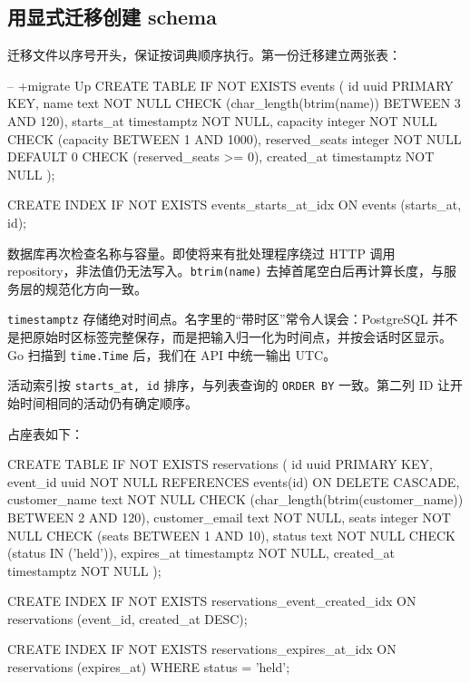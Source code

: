 \subsection{用显式迁移创建 schema}

迁移文件以序号开头，保证按词典顺序执行。第一份迁移建立两张表：

\begin{sqlcode}[title={代码清单 12.36 \texttt{000001\_initial.sql}：活动表}]
-- +migrate Up
CREATE TABLE IF NOT EXISTS events (
    id              uuid PRIMARY KEY,
    name            text        NOT NULL
        CHECK (char_length(btrim(name)) BETWEEN 3 AND 120),
    starts_at       timestamptz NOT NULL,
    capacity        integer     NOT NULL
        CHECK (capacity BETWEEN 1 AND 1000),
    reserved_seats  integer     NOT NULL DEFAULT 0
        CHECK (reserved_seats >= 0),
    created_at      timestamptz NOT NULL
);

CREATE INDEX IF NOT EXISTS events_starts_at_idx
    ON events (starts_at, id);
\end{sqlcode}

数据库再次检查名称与容量。即使将来有批处理程序绕过 HTTP 调用 repository，非法值仍无法写入。\texttt{btrim(name)} 去掉首尾空白后再计算长度，与服务层的规范化方向一致。

\texttt{timestamptz} 存储绝对时间点。名字里的“带时区”常令人误会：PostgreSQL 并不是把原始时区标签完整保存，而是把输入归一化为时间点，并按会话时区显示。Go 扫描到 \texttt{time.Time} 后，我们在 API 中统一输出 UTC。

活动索引按 \texttt{starts\_at, id} 排序，与列表查询的 \texttt{ORDER BY} 一致。第二列 ID 让开始时间相同的活动仍有确定顺序。

占座表如下：

\begin{sqlcode}[title={代码清单 12.37 \texttt{000001\_initial.sql}：占座表与索引}]
CREATE TABLE IF NOT EXISTS reservations (
    id              uuid PRIMARY KEY,
    event_id        uuid NOT NULL
        REFERENCES events(id) ON DELETE CASCADE,
    customer_name   text NOT NULL
        CHECK (char_length(btrim(customer_name)) BETWEEN 2 AND 120),
    customer_email  text        NOT NULL,
    seats           integer     NOT NULL
        CHECK (seats BETWEEN 1 AND 10),
    status          text        NOT NULL
        CHECK (status IN ('held')),
    expires_at      timestamptz NOT NULL,
    created_at      timestamptz NOT NULL
);

CREATE INDEX IF NOT EXISTS reservations_event_created_idx
    ON reservations (event_id, created_at DESC);

CREATE INDEX IF NOT EXISTS reservations_expires_at_idx
    ON reservations (expires_at)
    WHERE status = 'held';
\end{sqlcode}

